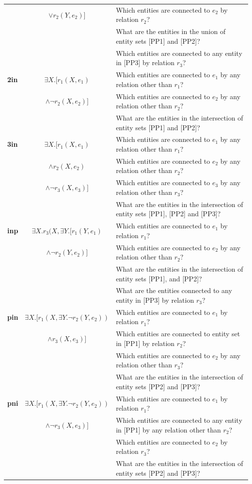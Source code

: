 \documentclass{article} %
\begin{document}
{\begin{table}[htbp]
{\begin{tabular}{l|c|p{27em}}
&$\vee r_2(Y,e_2)]$&Which entities are connected to $e_2$ by relation $r_2$?\\
&&What are the entities in the union of entity sets [PP1] and [PP2]?\\
&&Which entities are connected to any entity in [PP3] by relation $r_3$?\\\hline
         \textbf{2in}& $\exists X.[r_1(X,e_1)$&Which entities are connected to $e_1$ by any relation other than $r_1$?\\
&$\wedge \neg r_2(X,e_2)]$&Which entities are connected to $e_2$ by any relation other than $r_2$?\\
&&What are the entities in the intersection of entity sets [PP1] and [PP2]?\\\hline
         \textbf{3in}& $\exists X.[r_1(X,e_1)$&Which entities are connected to $e_1$ by any relation other than $r_1$?\\
&$\wedge r_2(X,e_2) $&Which entities are connected to $e_2$ by any relation other than $r_2$?\\
&$\wedge \neg r_3(X,e_3)]$&Which entities are connected to $e_3$ by any relation other than $r_3$?\\
&&What are the entities in the intersection of entity sets [PP1], [PP2] and [PP3]?\\\hline
         \textbf{inp}& $\exists X.r_3(X, \exists Y.[r_1(Y,e_1)$&Which entities are connected to $e_1$ by relation $r_1$?\\
&$\wedge \neg r_2(Y,e_2)]$&Which entities are connected to $e_2$ by any relation other than $r_2$?\\
&&What are the entities in the intersection of entity sets [PP1], and [PP2]?\\
&&What are the entities connected to any entity in [PP3] by relation $r_3$?\\\hline
         \textbf{pin}& $\exists X.[r_1(X,\exists Y.\neg r_2(Y,e_2))$&Which entities are connected to $e_1$ by relation $r_1$?\\
&$\wedge r_3(X,e_3)]$&Which entities are connected to entity set in [PP1] by relation $r_2$?\\
&&Which entities are connected to $e_2$ by any relation other than $r_3$?\\
&&What are the entities in the intersection of entity sets [PP2] and [PP3]?\\\hline
         \textbf{pni}& $\exists X.[r_1(X,\exists Y.\neg r_2(Y,e_2))$&Which entities are connected to $e_1$ by relation $r_1$?\\
&$\wedge \neg r_3(X,e_3)]$&Which entities are connected to any entity in [PP1] by any relation other than $r_2$?\\
&&Which entities are connected to $e_2$ by relation $r_3$?\\
&&What are the entities in the intersection of entity sets [PP2] and [PP3]?\\
    \hline
    \end{tabular}}
    \label{tab:decomp_prompts}
\end{table}
}
\end{document}
